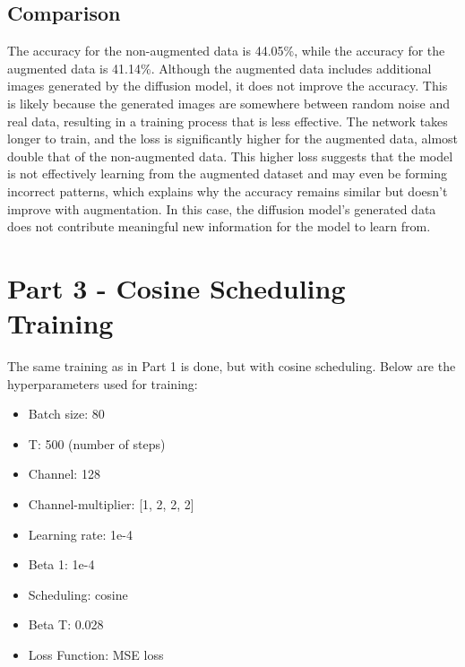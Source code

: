 \documentclass[conference]{IEEEtran}
\begin{document}
\subsection{Comparison}
The accuracy for the non-augmented data is 44.05\%, while the accuracy for the augmented data is 41.14\%. 
Although the augmented data includes additional images generated by the diffusion model, 
it does not improve the accuracy. This is likely because the generated images are somewhere between random noise and real data, resulting in a training process that is less effective. The network takes longer to train, and the loss is significantly higher for the augmented data, almost double that of the non-augmented data. This higher loss suggests that the model is not effectively learning from the augmented dataset and may even be forming incorrect patterns, which explains why the accuracy remains similar but doesn't improve with augmentation. In this case, the diffusion model’s generated data does not contribute meaningful new information for the model to learn from.



\section{Part 3 - Cosine Scheduling Training}
The same training as in Part 1 is done, but with cosine scheduling. Below are the hyperparameters used for training:
\begin{itemize}
  \item Batch size: 80
  \item T: 500 (number of steps)
  \item Channel: 128
  \item Channel-multiplier: [1, 2, 2, 2]
  \item Learning rate: 1e-4
  \item Beta 1: 1e-4
  \item Scheduling: cosine
  \item Beta T: 0.028
  \item Loss Function: MSE loss
\end{itemize}
\end{document}
